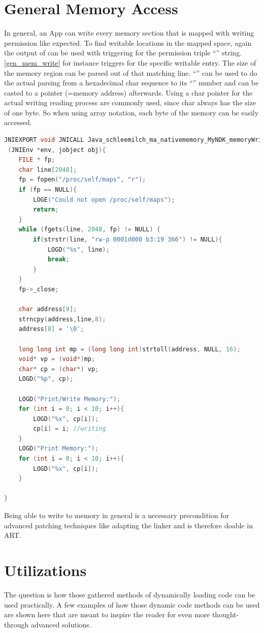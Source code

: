 \section{General Memory Access}\label{section:general_mem_access}
In general, an App can write every memory section that is mapped with writing permission like expected. To find writable locations in the mapped space, again the output of  can be used with triggering for the permission triple ``'' string. \autoref{gen_mem_write} for instance triggers for the specific writable  entry. The size of the memory region can be parsed out of that matching line. ``'' can be used to do the actual parsing from a
hexadecimal char sequence to its ``'' number and can be casted to a pointer (=memory address) afterwards.
Using a char pointer for the actual writing reading process
are commonly used, since char always has the size of one byte. So when using array notation, each byte of the memory can be easily accessed.
\begin{lstlisting}[language=C++, caption=memoryWriting(), label=gen_mem_write]
JNIEXPORT void JNICALL Java_schleemilch_ma_nativememory_MyNDK_memoryWriting
 (JNIEnv *env, jobject obj){
    FILE * fp;
    char line[2048];
    fp = fopen("/proc/self/maps", "r");
    if (fp == NULL){
        LOGE("Could not open /proc/self/maps");
        return;
    }
    while (fgets(line, 2048, fp) != NULL) {
        if(strstr(line, "rw-p 0001d000 b3:19 366") != NULL){
            LOGD("%s", line);
            break;
        }
    }
    fp->_close;

    char address[9];
    strncpy(address,line,8);
    address[8] = '\0';

    long long int mp = (long long int)strtoll(address, NULL, 16);
    void* vp = (void*)mp;
    char* cp = (char*) vp;
    LOGD("%p", cp);

    LOGD("Print/Write Memory:");
    for (int i = 0; i < 10; i++){
        LOGD("%x", cp[i]);
        cp[i] = i; //writing
    }
    LOGD("Print Memory:");
    for (int i = 0; i < 10; i++){
        LOGD("%x", cp[i]);
    }

}
\end{lstlisting}
Being able to write to memory in general is a necessary precondition for advanced patching techniques like adapting the linker and is therefore doable in ART.

\section{Utilizations}
The question is how those gathered methods of dynamically loading code can be
used practically. A few examples of how those dynamic code methods can be used
are shown here that are meant to inspire the reader for even more thought-through
advanced solutions.

